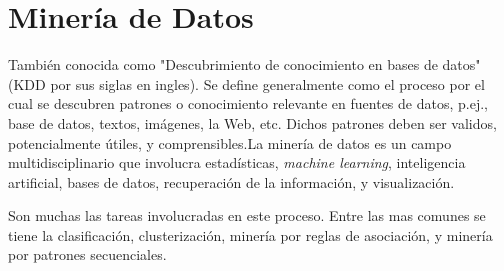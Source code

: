 \section{Minería de Datos}
También conocida como "Descubrimiento de conocimiento en bases de datos" (KDD por sus siglas en ingles). Se define generalmente como el proceso por el cual se descubren patrones o conocimiento relevante en fuentes de datos, p.ej., base de datos, textos, imágenes, la Web, etc. Dichos patrones deben ser validos, potencialmente útiles, y comprensibles.La minería de datos es un campo multidisciplinario que involucra  estadísticas,\emph{ machine learning}, inteligencia artificial, bases de datos, recuperación de la información, y visualización.\cite{webmining}

Son muchas las tareas involucradas en este proceso. Entre las mas comunes se tiene la clasificación, clusterización, minería por reglas de asociación, y minería por patrones secuenciales.\cite{webmining}









